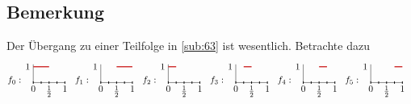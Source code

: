 \subsection[Bemerkung: Der Übergang zu einer Teilfolge in \ref{sub:63} ist wesentlich]{Bemerkung} %
\label{sub:65}
Der Übergang zu einer Teilfolge in \ref{sub:63} ist wesentlich. Betrachte dazu
\[
	f_0 : \!
	\vcenter{\hbox{\begin{tikzpicture}[scale=0.3]
		\draw (0,0) node[below]{$0$} -- (2,0)node[below]{$\frac{1}{2} $} -- (4,0) node[below]{$1$};
		\draw (0,0) -- (0,2.3);
		\node[left] at (0,2) {$1$};
		\draw[very thick, Firebrick3] (0,2)-- (2,2);
	  	\foreach \x in {0,1,2,...,4}%
	           \draw[line width=0.3mm](\x,-0.15)--(\x,0.15);
	  	
	\end{tikzpicture}}} \enspace
	f_1 : \!
	\vcenter{\hbox{\begin{tikzpicture}[scale=0.3]
		\draw (0,0) node[below]{$0$} -- (2,0)node[below]{$\frac{1}{2} $} -- (4,0) node[below]{$1$};
		\draw (0,0) -- (0,2.3);
		\node[left] at (0,2) {$1$};
		\draw[very thick, Firebrick3] (2,2)-- (4,2);
	  	\foreach \x in {0,1,2,...,4}%
	           \draw[line width=0.3mm](\x,-0.15)--(\x,0.15);
	  	
	\end{tikzpicture}}} \enspace
	f_2 : \!
	\vcenter{\hbox{\begin{tikzpicture}[scale=0.3]
		\draw (0,0) node[below]{$0$} -- (2,0)node[below]{$\frac{1}{2} $} -- (4,0) node[below]{$1$};
		\draw (0,0) -- (0,2.3);
		\node[left] at (0,2) {$1$};
		\draw[very thick, Firebrick3] (0,2)-- (1,2);
	  	\foreach \x in {0,1,2,...,4}%
	           \draw[line width=0.3mm](\x,-0.15)--(\x,0.15);
	  	
	\end{tikzpicture}}} \enspace
	f_3 : \!
	\vcenter{\hbox{\begin{tikzpicture}[scale=0.3]
		\draw (0,0) node[below]{$0$} -- (2,0)node[below]{$\frac{1}{2} $} -- (4,0) node[below]{$1$};
		\draw (0,0) -- (0,2.3);
		\node[left] at (0,2) {$1$};
		\draw[very thick, Firebrick3] (1,2)-- (2,2);
	  	\foreach \x in {0,1,2,...,4}%
	           \draw[line width=0.3mm](\x,-0.15)--(\x,0.15);
	  	
	\end{tikzpicture}}} \enspace
	f_4 : \!
	\vcenter{\hbox{\begin{tikzpicture}[scale=0.3]
		\draw (0,0) node[below]{$0$} -- (2,0)node[below]{$\frac{1}{2} $} -- (4,0) node[below]{$1$};
		\draw (0,0) -- (0,2.3);
		\node[left] at (0,2) {$1$};
		\draw[very thick, Firebrick3] (2,2)-- (3,2);
	  	\foreach \x in {0,1,2,...,4}%
	           \draw[line width=0.3mm](\x,-0.15)--(\x,0.15);
	  	
	\end{tikzpicture}}} \enspace
	f_5 : \!
	\vcenter{\hbox{\begin{tikzpicture}[scale=0.3]
		\draw (0,0) node[below]{$0$} -- (2,0)node[below]{$\frac{1}{2} $} -- (4,0) node[below]{$1$};
		\draw (0,0) -- (0,2.3);
		\node[left] at (0,2) {$1$};
		\draw[very thick, Firebrick3] (3,2)-- (4,2);
	  	\foreach \x in {0,1,2,...,4}%
	           \draw[line width=0.3mm](\x,-0.15)--(\x,0.15);
	  	
	\end{tikzpicture}}} \enspace
\]
